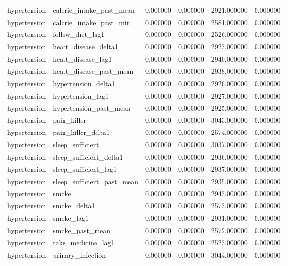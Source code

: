 \begin{longtable}{llrrrr}
hypertension & calorie\_intake\_past\_mean & 0.000000 & 0.000000 & 2921.000000 & 0.000000 \\
hypertension & calorie\_intake\_past\_min & 0.000000 & 0.000000 & 2581.000000 & 0.000000 \\
hypertension & follow\_diet\_lag1 & 0.000000 & 0.000000 & 2526.000000 & 0.000000 \\
hypertension & heart\_disease\_delta1 & 0.000000 & 0.000000 & 2923.000000 & 0.000000 \\
hypertension & heart\_disease\_lag1 & 0.000000 & 0.000000 & 2940.000000 & 0.000000 \\
hypertension & heart\_disease\_past\_mean & 0.000000 & 0.000000 & 2938.000000 & 0.000000 \\
hypertension & hypertension\_delta1 & 0.000000 & 0.000000 & 2926.000000 & 0.000000 \\
hypertension & hypertension\_lag1 & 0.000000 & 0.000000 & 2927.000000 & 0.000000 \\
hypertension & hypertension\_past\_mean & 0.000000 & 0.000000 & 2925.000000 & 0.000000 \\
hypertension & pain\_killer & 0.000000 & 0.000000 & 3043.000000 & 0.000000 \\
hypertension & pain\_killer\_delta1 & 0.000000 & 0.000000 & 2574.000000 & 0.000000 \\
hypertension & sleep\_sufficient & 0.000000 & 0.000000 & 3037.000000 & 0.000000 \\
hypertension & sleep\_sufficient\_delta1 & 0.000000 & 0.000000 & 2936.000000 & 0.000000 \\
hypertension & sleep\_sufficient\_lag1 & 0.000000 & 0.000000 & 2937.000000 & 0.000000 \\
hypertension & sleep\_sufficient\_past\_mean & 0.000000 & 0.000000 & 2935.000000 & 0.000000 \\
hypertension & smoke & 0.000000 & 0.000000 & 2943.000000 & 0.000000 \\
hypertension & smoke\_delta1 & 0.000000 & 0.000000 & 2573.000000 & 0.000000 \\
hypertension & smoke\_lag1 & 0.000000 & 0.000000 & 2931.000000 & 0.000000 \\
hypertension & smoke\_past\_mean & 0.000000 & 0.000000 & 2572.000000 & 0.000000 \\
hypertension & take\_medicine\_lag1 & 0.000000 & 0.000000 & 2523.000000 & 0.000000 \\
hypertension & urinary\_infection & 0.000000 & 0.000000 & 3044.000000 & 0.000000 \\

\end{longtable}
